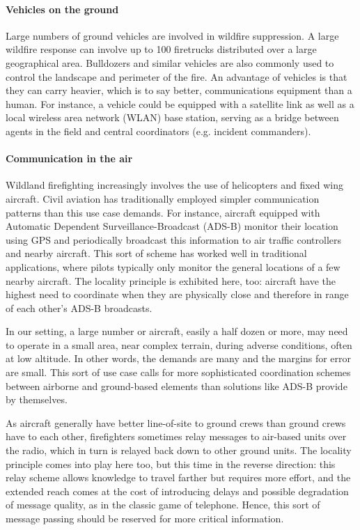 \documentclass[]             %
{NASA}                       %
\theoremstyle{definition}
\begin{document}
\paragraph{Vehicles on the ground}
Large numbers of ground vehicles are involved in wildfire
suppression. A large wildfire response can involve up to 100
firetrucks distributed over a large geographical area. Bulldozers and
similar vehicles are also commonly used to control the landscape and
perimeter of the fire. An advantage of vehicles is that they can carry
heavier, which is to say better, communications equipment than a
human. For instance, a vehicle could be equipped with a satellite link
as well as a local wireless area network (WLAN) base station, serving
as a bridge between agents in the field and central coordinators
(e.g. incident commanders).

\paragraph{Communication in the air}

Wildland firefighting increasingly involves the use of helicopters and
fixed wing aircraft. Civil aviation has traditionally employed simpler
communication patterns than this use case demands. For instance,
aircraft equipped with Automatic Dependent Surveillance-Broadcast
(ADS-B) monitor their location using GPS and periodically broadcast
this information to air traffic controllers and nearby aircraft. This
sort of scheme has worked well in traditional applications, where
pilots typically only monitor the general locations of a few nearby
aircraft. The locality principle is exhibited here, too: aircraft have
the highest need to coordinate when they are physically close and
therefore in range of each other's ADS-B broadcasts.

In our setting, a large number or aircraft, easily a half dozen or
more, may need to operate in a small area, near complex terrain,
during adverse conditions, often at low altitude. In other words, the
demands are many and the margins for error are small. This sort of use
case calls for more sophisticated coordination schemes between
airborne and ground-based elements than solutions like ADS-B provide
by themselves.

As aircraft generally have better line-of-site to ground crews than
ground crews have to each other, firefighters sometimes relay messages
to air-based units over the radio, which in turn is relayed back down
to other ground units. The locality principle comes into play here
too, but this time in the reverse direction: this relay scheme allows
knowledge to travel farther but requires more effort, and the extended
reach comes at the cost of introducing delays and possible degradation
of message quality, as in the classic game of telephone. Hence, this
sort of message passing should be reserved for more critical
information.
\end{document}
